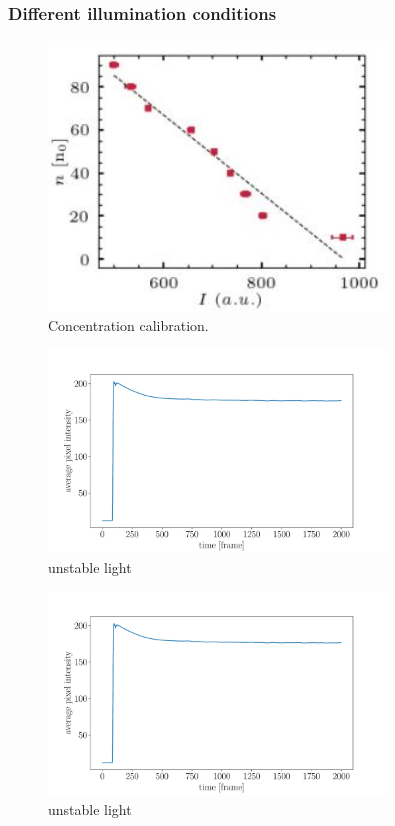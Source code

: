 \documentclass[preprint,aps,prl,amsmath,amssymb,longbibliography]{revtex4-2}
\begin{document}
\subsubsection{Different illumination conditions}



\begin{figure}[ht]
\begin{center}
\includegraphics[width=0.8\textwidth]{fig-s1_conc-calibration.jpg}
\caption[]
{
Concentration calibration.
}
\end{center}
\label{fig:s1}
\end{figure}


\begin{figure}[ht]
\begin{center}
\includegraphics[width=0.8\textwidth]{fig-s2_unstable-light.pdf}
\caption[]
{
unstable light
}
\end{center}
\label{fig:s2}
\end{figure}

\begin{figure}[ht]
\begin{center}
\includegraphics[width=0.8\textwidth]{fig-s2_unstable-light.pdf}
\caption[]
{
unstable light
}
\end{center}
\label{fig:s3}
\end{figure}
\end{document}
